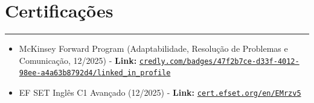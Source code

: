 \documentclass[10pt,a4paper]{article}
\begin{document}
\section*{Certificações}
\hrule \vspace{2mm}
\begin{itemize}[nosep]
    \item McKinsey Forward Program (Adaptabilidade, Resolução de Problemas e Comunicação, 12/2025) - \textbf{Link:} \href{https://www.credly.com/badges/47f2b7ce-d33f-4012-98ee-a4a63b8792d4/linked_in_profile}{\nolinkurl{credly.com/badges/47f2b7ce-d33f-4012-98ee-a4a63b8792d4/linked_in_profile}}
    \item EF SET Inglês C1 Avançado (12/2025) - \textbf{Link:} \href{https://cert.efset.org/en/EMrzv5}{\nolinkurl{cert.efset.org/en/EMrzv5}}
\end{itemize}
\end{document}
